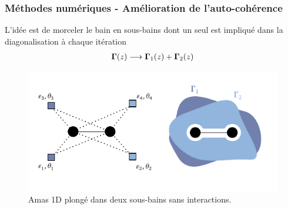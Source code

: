 \begin{frame}
    \frametitle{Méthodes numériques - Amélioration de l'auto-cohérence}
    L'idée est de morceler le bain en sous-bains dont un seul est impliqué dans
    la diagonalisation à chaque itération
    \begin{align}
        \vb{\Gamma}(z)\longrightarrow\vb{\Gamma}_1(z) + \vb{\Gamma}_2(z)
    \end{align}
    \begin{figure}
         \centering
         \includegraphics[scale=0.75]{./figures/theory/1D_2s_4vb_bulks.pdf}
         \caption{Amas 1D plongé dans deux sous-bains sans interactions.}
         \label{fig: amas_CDMFT_virtual}
    \end{figure}
\end{frame}

